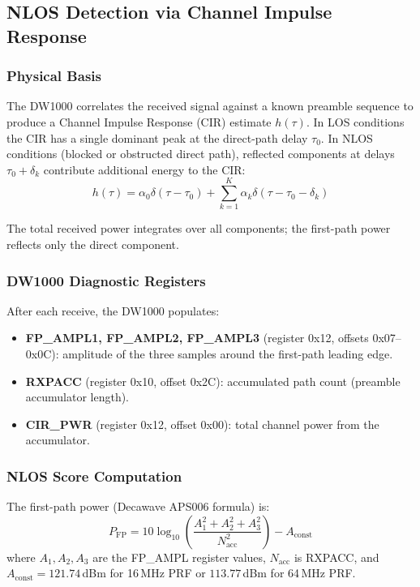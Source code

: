 \documentclass[11pt,a4paper]{article}
\begin{document}
\subsection{NLOS Detection via Channel Impulse Response}

\subsubsection{Physical Basis}

The DW1000 correlates the received signal against a known preamble sequence to produce a Channel Impulse Response (CIR) estimate $h(\tau)$. In LOS conditions the CIR has a single dominant peak at the direct-path delay $\tau_0$. In NLOS conditions (blocked or obstructed direct path), reflected components at delays $\tau_0 + \delta_k$ contribute additional energy to the CIR:
\[
h(\tau) = \alpha_0 \delta(\tau - \tau_0) + \sum_{k=1}^{K} \alpha_k \delta(\tau - \tau_0 - \delta_k)
\]

The total received power integrates over all components; the first-path power reflects only the direct component.

\subsubsection{DW1000 Diagnostic Registers}

After each receive, the DW1000 populates:
\begin{itemize}[leftmargin=2em]
  \item \textbf{FP\_AMPL1, FP\_AMPL2, FP\_AMPL3} (register 0x12, offsets 0x07--0x0C): amplitude of the three samples around the first-path leading edge.
  \item \textbf{RXPACC} (register 0x10, offset 0x2C): accumulated path count (preamble accumulator length).
  \item \textbf{CIR\_PWR} (register 0x12, offset 0x00): total channel power from the accumulator.
\end{itemize}

\subsubsection{NLOS Score Computation}

The first-path power (Decawave APS006 formula) is:
\begin{equation}
P_\text{FP} = 10 \log_{10}\!\left(\frac{A_1^2 + A_2^2 + A_3^2}{N_\text{acc}^2}\right) - A_\text{const}
\label{eq:fppower}
\end{equation}
where $A_1, A_2, A_3$ are the FP\_AMPL register values, $N_\text{acc}$ is RXPACC, and $A_\text{const} = 121.74$\,dBm for 16\,MHz PRF or $113.77$\,dBm for 64\,MHz PRF.
\end{document}
